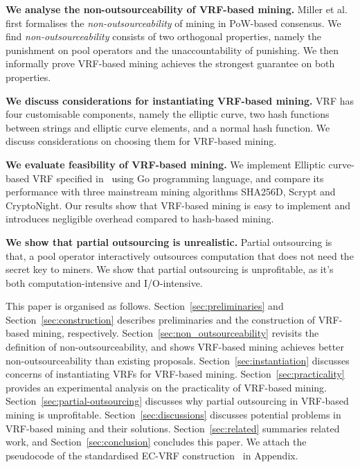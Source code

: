 \textbf{We analyse the non-outsourceability of VRF-based mining.}
Miller et al.~\cite{miller2015nonoutsourceable} first formalises the \emph{non-outsourceability} of mining in PoW-based consensus.
We find \emph{non-outsourceability} consists of two orthogonal properties, namely the punishment on pool operators and the unaccountability of punishing.
We then informally prove VRF-based mining achieves the strongest guarantee on both properties.

\textbf{We discuss considerations for instantiating VRF-based mining.}
VRF has four customisable components, namely the elliptic curve, two hash functions between strings and elliptic curve elements, and a normal hash function.
We discuss considerations on choosing them for VRF-based mining.

\textbf{We evaluate feasibility of VRF-based mining.}
We implement Elliptic curve-based VRF specified in~\cite{goldberg2017draft} using Go programming language, and compare its performance with three mainstream mining algorithms SHA256D, Scrypt and CryptoNight.
Our results show that VRF-based mining is easy to implement and introduces negligible overhead compared to hash-based mining.

\textbf{We show that partial outsourcing is unrealistic.}
Partial outsourcing is that, a pool operator interactively outsources computation that does not need the secret key to miners.
We show that partial outsourcing is unprofitable, as it's both computation-intensive and I/O-intensive.

This paper is organised as follows.
Section~\ref{sec:preliminaries} and Section~\ref{sec:construction} describes preliminaries and the construction of VRF-based mining, respectively.
Section~\ref{sec:non_outsourceability} revisits the definition of non-outsourceability, and shows VRF-based mining achieves better non-outsourceability than existing proposals.
Section~\ref{sec:instantiation} discusses concerns of instantiating VRFs for VRF-based mining.
Section~\ref{sec:practicality} provides an experimental analysis on the practicality of VRF-based mining.
Section~\ref{sec:partial-outsourcing} discusses why partial outsourcing in VRF-based mining is unprofitable.
Section~\ref{sec:discussions} discusses potential problems in VRF-based mining and their solutions.
Section~\ref{sec:related} summaries related work, and Section~\ref{sec:conclusion} concludes this paper.
We attach the pseudocode of the standardised EC-VRF construction~\cite{goldberg2017draft} in Appendix.
